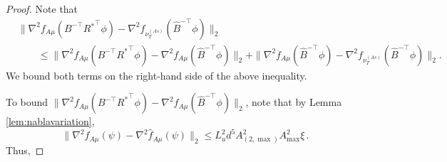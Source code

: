 \begin{proof}
	Note that 
	\begin{align*}
	& \|\nabla^2 f_{A\mu}(B^{-\top}R{^*}^{\top}\phi) - \nabla^2 f_{\nu_T^{(As)}}(\hat{B}^{-\top}\phi)\|_2 \\
	&\qquad \le 
	\|\nabla^2 f_{A\mu}(B^{-\top}{R^*}^{\top}\phi) - \nabla^2 f_{A\mu}(\hat{B}^{-\top}\phi)\|_2
	+ \|\nabla^2 f_{A\mu}(\hat{B}^{-\top}\phi) - \nabla^2 f_{\nu_T^{(As)}}(\hat{B}^{-\top}\phi)\|_2.
	\end{align*}
	We bound both terms on the right-hand side of the above inequality. 
	
	To bound $\|\nabla^2 f_{A\mu}(B^{-\top}{R^*}^{\top}\phi) - \nabla^2 f_{A\mu}(\hat{B}^{-\top}\phi)\|_2$, note that by Lemma \ref{lem:nablavariation}, 
	$$\|\nabla^2 f_{A\mu}(\psi) - \nabla^2 \widehat{f}_{A\mu}(\psi)\|_2 \le L_u^2  d^5 A_{(2,\max)}^2A_{\max}^2\xi\,.$$ 
	Thus,
	

\end{proof}
